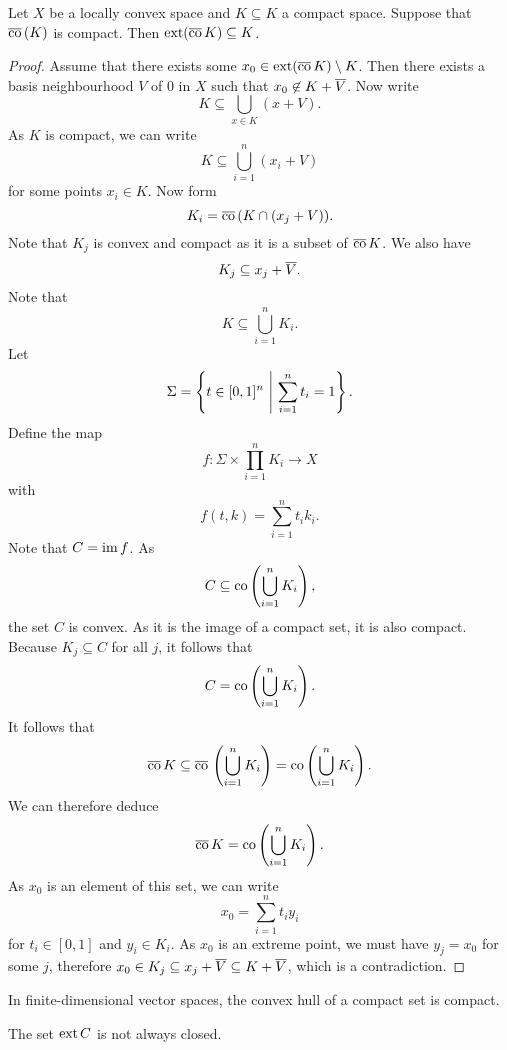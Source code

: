 \begin{izrek}[Milman]
Let $X$ be a locally convex space and $K \subseteq K$ a compact
space. Suppose that $\overline{\operatorname{co}}\,(K)$ is compact. Then
$\operatorname{ext} (\overline{\operatorname{co}}\,K) \subseteq K$.
\end{izrek}

\begin{proof}
Assume that there exists some
$x_0 \in \operatorname{ext}(\overline{\operatorname{co}}\,K) \setminus K$. Then there exists a
basis neighbourhood $V$ of $0$ in $X$ such that
$x_0 \not \in K + \overline{V}$. Now write
\[
K \subseteq \bigcup_{x \in K} (x + V).
\]
As $K$ is compact, we can write
\[
K \subseteq \bigcup_{i=1}^n (x_i + V)
\]
for some points $x_i \in K$. Now form
\[
K_i = \overline{\operatorname{co}}\,(K \cap (x_j + V)).
\]
Note that $K_j$ is convex and compact as it is a subset of
$\overline{\operatorname{co}}\,K$. We also have
\[
K_j \subseteq x_j + \overline{V}.
\]
Note that
\[
K \subseteq \bigcup_{i=1}^n K_i.
\]
Let
\[
\Sigma = \left\{t \in [0,1]^n~\middle\vert~\sum_{i=1}^n t_i = 1\right\}.
\]
Define the map
\[
f \colon \Sigma \times \prod_{i=1}^n K_i \to X
\]
with
\[
f(t, k) = \sum_{i=1}^n t_i k_i.
\]
Note that $C = \operatorname{im} f$. As
\[
C \subseteq \operatorname{co} \left(\bigcup_{i=1}^n K_i\right),
\]
the set $C$ is convex. As it is the image of a compact set, it is
also compact. Because $K_j \subseteq C$ for all $j$, it follows
that
\[
C = \operatorname{co} \left(\bigcup_{i=1}^n K_i\right).
\]
It follows that
\[
\overline{\operatorname{co}}\,K \subseteq
\overline{\operatorname{co}}\,\left(\bigcup_{i=1}^n K_i\right) =
\operatorname{co} \left(\bigcup_{i=1}^n K_i\right).
\]
We can therefore deduce
\[
\overline{\operatorname{co}}\,K = \operatorname{co} \left(\bigcup_{i=1}^n K_i\right).
\]
As $x_0$ is an element of this set, we can write
\[
x_0 = \sum_{i=1}^n t_i y_i
\]
for $t_i \in [0,1]$ and $y_i \in K_i$. As $x_0$ is an extreme
point, we must have $y_j = x_0$ for some $j$, therefore
$x_0 \in K_j \subseteq x_j + \overline{V} \subseteq K + \overline{V}$,
which is a contradiction.
\end{proof}

\begin{opomba}
In finite-dimensional vector spaces, the convex hull of a compact
set is compact.
\end{opomba}

\begin{opomba}
The set $\operatorname{ext} C$ is not always closed.
\end{opomba}
